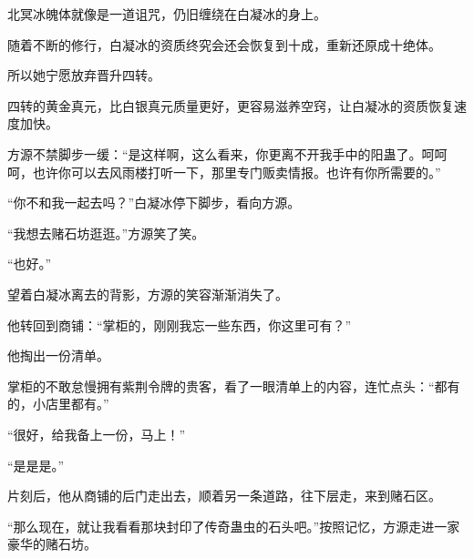 \begin{this_body}
北冥冰魄体就像是一道诅咒，仍旧缠绕在白凝冰的身上。

随着不断的修行，白凝冰的资质终究会还会恢复到十成，重新还原成十绝体。

所以她宁愿放弃晋升四转。

四转的黄金真元，比白银真元质量更好，更容易滋养空窍，让白凝冰的资质恢复速度加快。

方源不禁脚步一缓：“是这样啊，这么看来，你更离不开我手中的阳蛊了。呵呵呵，也许你可以去风雨楼打听一下，那里专门贩卖情报。也许有你所需要的。”

“你不和我一起去吗？”白凝冰停下脚步，看向方源。

“我想去赌石坊逛逛。”方源笑了笑。

“也好。”

望着白凝冰离去的背影，方源的笑容渐渐消失了。

他转回到商铺：“掌柜的，刚刚我忘一些东西，你这里可有？”

他掏出一份清单。

掌柜的不敢怠慢拥有紫荆令牌的贵客，看了一眼清单上的内容，连忙点头：“都有的，小店里都有。”

“很好，给我备上一份，马上！”

“是是是。”

片刻后，他从商铺的后门走出去，顺着另一条道路，往下层走，来到赌石区。

“那么现在，就让我看看那块封印了传奇蛊虫的石头吧。”按照记忆，方源走进一家豪华的赌石坊。

\end{this_body}

